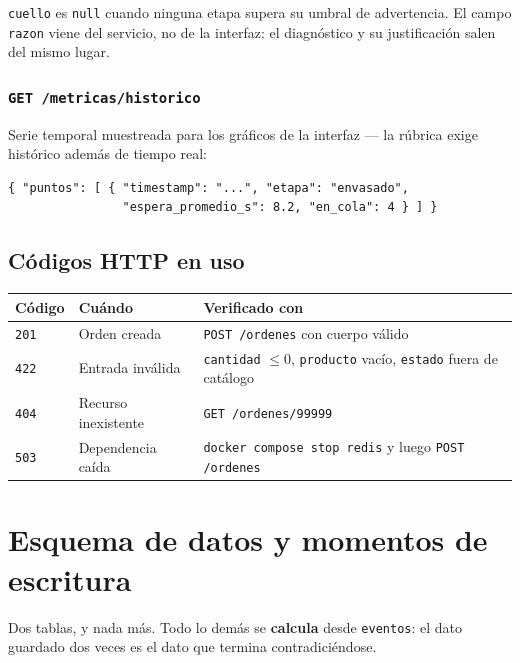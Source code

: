 \documentclass[12pt,a4paper]{article}
\begin{document}
\texttt{cuello} es \texttt{null} cuando ninguna etapa supera su umbral de
advertencia. El campo \texttt{razon} viene del servicio, no de la interfaz: el
diagnóstico y su justificación salen del mismo lugar.

\subsubsection*{\texttt{GET /metricas/historico}}

Serie temporal muestreada para los gráficos de la interfaz — la rúbrica exige
histórico además de tiempo real:

\begin{lstlisting}
{ "puntos": [ { "timestamp": "...", "etapa": "envasado",
                "espera_promedio_s": 8.2, "en_cola": 4 } ] }
\end{lstlisting}

\subsection{Códigos HTTP en uso}

\begin{table}[H]
\centering
\footnotesize
\begin{tabular}{@{}llp{8.2cm}@{}}
\toprule
\textbf{Código} & \textbf{Cuándo} & \textbf{Verificado con} \\
\midrule
\texttt{201} & Orden creada & \texttt{POST /ordenes} con cuerpo válido \\
\texttt{422} & Entrada inválida & \texttt{cantidad} $\leq 0$, \texttt{producto} vacío, \texttt{estado} fuera de catálogo \\
\texttt{404} & Recurso inexistente & \texttt{GET /ordenes/99999} \\
\texttt{503} & Dependencia caída & \texttt{docker compose stop redis} y luego \texttt{POST /ordenes} \\
\bottomrule
\end{tabular}
\end{table}

\newpage
\section{Esquema de datos y momentos de escritura}
\label{anexo:datos}

Dos tablas, y nada más. Todo lo demás se \textbf{calcula} desde \texttt{eventos}:
el dato guardado dos veces es el dato que termina contradiciéndose.
\end{document}
